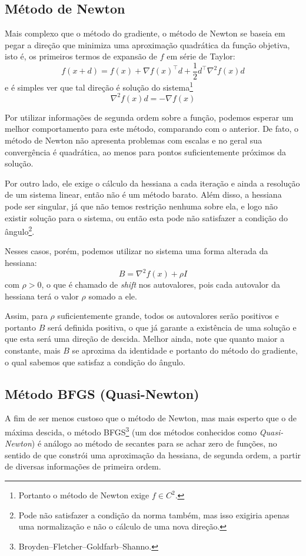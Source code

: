 \documentclass[a4paper,11pt]{article}
\begin{document}
        \subsection*{Método de Newton}
            Mais complexo que o método do gradiente, o método de Newton se baseia em pegar a direção que minimiza uma aproximação quadrática da função objetiva,
            isto é, os primeiros termos de expansão de $f$ em série de Taylor:
                $$ f(x + d) = f(x) + \nabla f(x)^\top d + \frac{1}{2}d^\top\nabla^2f(x)d $$
            e é simples ver que tal direção é solução do sistema\footnote{Portanto o método de Newton exige $f \in C^2$.}
                $$ \nabla^2 f(x)d = -\nabla f(x)$$

            Por utilizar informações de segunda ordem sobre a função, podemos esperar um melhor comportamento para este método, comparando com o anterior.
            De fato, o método de Newton não apresenta problemas com escalas e no geral sua convergência é quadrática, ao menos para pontos suficientemente
            próximos da solução.

            Por outro lado, ele exige o cálculo da hessiana a cada iteração e ainda a resolução de um sistema linear, então não é um método barato.
            Além disso, a hessiana pode ser singular, já que não temos restrição nenhuma sobre ela, e logo não existir solução para o sistema,
            ou então esta pode não satisfazer a condição do ângulo\footnote{Pode não satisfazer a condição da norma também, mas isso exigiria apenas uma normalização e não o cálculo de uma nova direção.}.

            Nesses casos, porém, podemos utilizar no sistema uma forma alterada da hessiana:
                $$ B = \nabla^2 f(x) + \rho I $$
            com $\rho > 0$, o que é chamado de \emph{shift} nos autovalores, pois cada autovalor da hessiana terá o valor $\rho$ somado a ele.

            Assim, para $\rho$ suficientemente grande, todos os autovalores serão positivos e portanto $B$ será definida positiva, o que já garante
            a existência de uma solução e que esta será uma direção de descida. Melhor ainda, note que quanto maior a constante, mais $B$ se aproxima
            da identidade e portanto do método do gradiente, o qual sabemos que satisfaz a condição do ângulo.

        \subsection*{Método BFGS (Quasi-Newton)}
            A fim de ser menos custoso que o método de Newton, mas mais esperto que o de máxima descida, o método BFGS\footnote{Broyden–Fletcher–Goldfarb–Shanno.} (um dos métodos conhecidos como \emph{Quasi-Newton}) é análogo ao método de secantes para se achar zero de funções, no sentido de que constrói uma aproximação da hessiana, de segunda ordem, a partir
            de diversas informações de primeira ordem.
\end{document}
